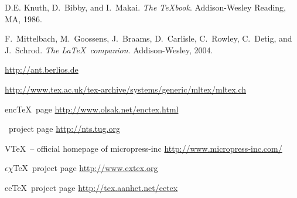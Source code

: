 \documentclass{scrartcl}
\begin{document}

\clearpage
\normalsize
\begin{thebibliography}{10}
\label{sec:refs}

	\vspace{2ex}
	\vspace{1ex}
	D.E. Knuth, D.~Bibby, and I.~Makai.
	\newblock \emph{{The \TeX book}}.
	\newblock Addison-Wesley Reading, MA, 1986.
	
	F.~Mittelbach, M.~Goossens, J.~Braams, D.~Carlisle, C.~Rowley, C.~Detig, and
	  J.~Schrod.
	\newblock \emph{{The \LaTeX\ companion}}.
	\newblock Addison-Wesley, 2004.
	
	\vspace{2ex}
	\vspace{1ex}
	\vspace{1ex}
	
	\newblock \url{http://ant.berlios.de}
	
	\newblock \url{http://www.tex.ac.uk/tex-archive/systems/generic/mltex/mltex.ch}
	
	{enc\TeX\ page}
	\newblock \url{http://www.olsak.net/enctex.html}
	
	{\NTS\ project page}
	\newblock \url{http://nts.tug.org}
	
	{V\TeX\ – official homepage of micropress-inc}
	\newblock \url{http://www.micropress-inc.com/}
	
	{$\epsilon\chi$\TeX\ project page}
	\newblock \url{http://www.extex.org}
	
	{ee\TeX\ project page}
	\newblock \url{http://tex.aanhet.net/eetex}
	

\end{thebibliography}
\end{document}
